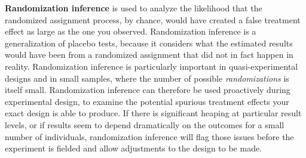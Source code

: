 \textbf{Randomization inference} is used to analyze the likelihood
that the randomized assignment process, by chance,
would have created a false treatment effect as large as the one you observed.
Randomization inference is a generalization of placebo tests,
because it considers what the estimated results would have been
from a randomized assignment that did not in fact happen in reality.
Randomization inference is particularly important
in quasi-experimental designs and in small samples,
where the number of possible \textit{randomizations} is itself small.
Randomization inference can therefore be used proactively during experimental design,
to examine the potential spurious treatment effects your exact design is able to produce.
If there is significant heaping at particular result levels,
or if results seem to depend dramatically on the outcomes for a small number of individuals,
randomization inference will flag those issues before the experiment is fielded
and allow adjustments to the design to be made.
